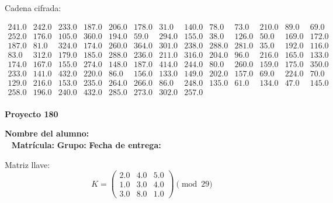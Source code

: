 \documentclass[12pt]{article}
\begin{document}
Cadena cifrada:
\begin{center}
$\begin{array}{lllllllllllll}
241.0 & 242.0 & 233.0 & 187.0 & 206.0 & 178.0 & 31.0 & 140.0 & 78.0 & 73.0 & 210.0 & 89.0 & 69.0\\
252.0 & 176.0 & 105.0 & 360.0 & 194.0 & 59.0 & 294.0 & 155.0 & 38.0 & 126.0 & 50.0 & 169.0 & 172.0\\
187.0 & 81.0 & 324.0 & 174.0 & 260.0 & 364.0 & 301.0 & 238.0 & 288.0 & 281.0 & 35.0 & 192.0 & 116.0\\
83.0 & 312.0 & 179.0 & 185.0 & 288.0 & 236.0 & 211.0 & 316.0 & 204.0 & 96.0 & 216.0 & 165.0 & 133.0\\
174.0 & 167.0 & 155.0 & 274.0 & 148.0 & 187.0 & 414.0 & 244.0 & 80.0 & 260.0 & 159.0 & 175.0 & 350.0\\
233.0 & 141.0 & 432.0 & 220.0 & 86.0 & 156.0 & 133.0 & 149.0 & 202.0 & 157.0 & 69.0 & 224.0 & 70.0\\
129.0 & 216.0 & 153.0 & 235.0 & 264.0 & 266.0 & 86.0 & 248.0 & 135.0 & 61.0 & 134.0 & 47.0 & 145.0\\
258.0 & 196.0 & 240.0 & 432.0 & 285.0 & 273.0 & 302.0 & 257.0\\
\end{array}$
\end{center}

\newpage


\textbf{Proyecto 180}

\textbf{Nombre del alumno:} \underline{\hspace{13cm}}\\\
\vspace{1cm}
\textbf{Matrícula:} \underline{\hspace{4cm}} \hspace{1cm}
\textbf{Grupo:} \underline{\hspace{2cm}}
\textbf{Fecha de entrega:} \underline{\hspace{2cm}}

\medskip

Matriz llave:
\[
K = \begin{pmatrix}
2.0 & 4.0 & 5.0\\
1.0 & 3.0 & 4.0\\
3.0 & 8.0 & 1.0
\end{pmatrix} \pmod{29}
\]
\end{document}
